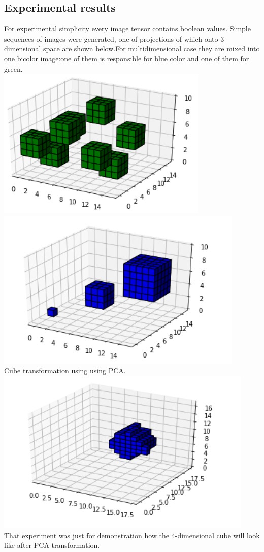 \documentclass[12pt]{article}
\begin{document}
\subsection{Experimental results}
For experimental simplicity every image tensor contains boolean values. Simple sequences of images were generated, one of projections of which onto 3-dimensional space are shown below.For multidimensional case they are mixed into one bicolor image:one of them is responsible for blue color and one of them for green.\\
\includegraphics[scale=0.8]{figures/1.png}
\includegraphics[scale=0.8]{figures/2.png}
\\
Cube transformation using using PCA.\\
\includegraphics[scale=0.8]{figures/4.png}\\
That experiment was just for demonstration how the 4-dimensional cube will look like after PCA transformation. 
\end{document}
